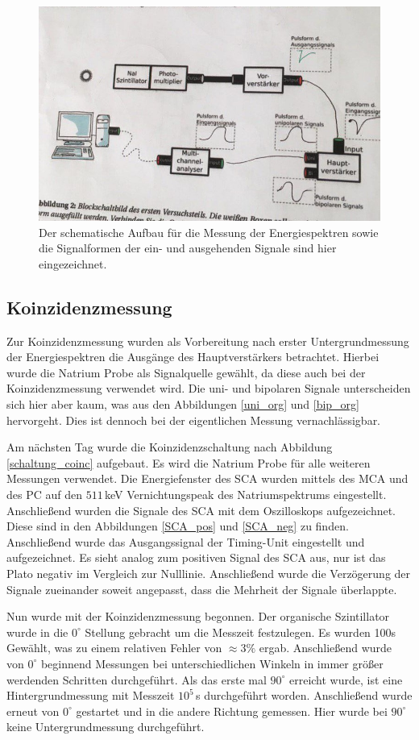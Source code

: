 \begin{figure}[h]
	\centering
	\includegraphics[scale=0.5]{Bilder/schaltung_energie}
	\caption[Schematischer Aufbau zur Energiemessung]{\small Der schematische Aufbau für die Messung der Energiespektren sowie die Signalformen der ein- und ausgehenden Signale sind hier eingezeichnet.}
	\label{schaltung_energie}
\end{figure}

\subsection{Koinzidenzmessung}
Zur Koinzidenzmessung wurden als Vorbereitung nach erster Untergrundmessung der Energiespektren die Ausgänge des Hauptverstärkers betrachtet. Hierbei wurde die Natrium Probe als Signalquelle gewählt, da diese auch bei der Koinzidenzmessung verwendet wird. Die uni- und bipolaren Signale unterscheiden sich hier aber kaum, was aus den Abbildungen \ref{uni_org} und \ref{bip_org} hervorgeht. Dies ist dennoch bei der eigentlichen Messung vernachlässigbar.\par
Am nächsten Tag wurde die Koinzidenzschaltung nach Abbildung \ref{schaltung_coinc}  aufgebaut. Es wird die Natrium Probe für alle weiteren Messungen verwendet. Die Energiefenster des SCA wurden mittels des MCA und des PC auf den $511\,$keV Vernichtungspeak des Natriumspektrums eingestellt. Anschließend wurden die Signale des SCA mit dem Oszilloskops aufgezeichnet. Diese sind in den Abbildungen \ref{SCA_pos} und \ref{SCA_neg} zu finden. Anschließend wurde das Ausgangssignal der Timing-Unit eingestellt und aufgezeichnet. Es sieht analog zum positiven Signal des SCA aus, nur ist das Plato negativ im Vergleich zur Nulllinie. Anschließend wurde die Verzögerung der Signale zueinander soweit angepasst, dass die Mehrheit der Signale überlappte. \par
Nun wurde mit der Koinzidenzmessung begonnen. Der organische Szintillator wurde in die $0^\circ$ Stellung gebracht um die Messzeit festzulegen. Es wurden 100s Gewählt, was zu einem relativen Fehler von $\approx 3\%$ ergab. Anschließend wurde von $0^\circ$ beginnend Messungen bei unterschiedlichen Winkeln in immer größer werdenden Schritten  durchgeführt. Als das erste mal $90^\circ$ erreicht wurde, ist eine Hintergrundmessung mit Messzeit $10^5\,$s durchgeführt worden. Anschließend wurde erneut von $0^\circ$ gestartet und in die andere Richtung gemessen. Hier wurde bei $90^\circ$ keine Untergrundmessung durchgeführt.

